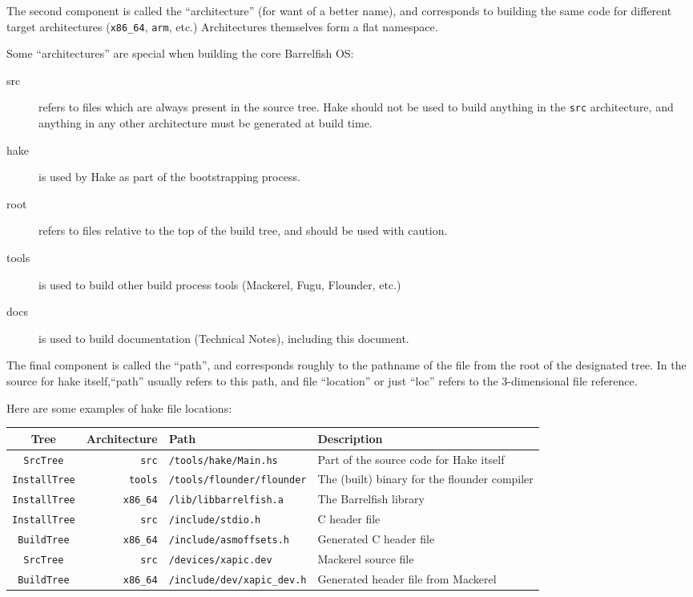 \documentclass[a4paper,twoside]{report} %
\begin{document}
The second component is called the ``architecture'' (for want
of a better name), and corresponds to building the same code for
different target architectures (\texttt{x86\_64}, \texttt{arm}, etc.)
Architectures themselves form a flat namespace. 

Some ``architectures'' are special when building the core Barrelfish OS:
\begin{description}
\item[src] refers to files which are always present in the source
tree.  Hake should not be used to build anything in the \texttt{src}
architecture, and anything in any other architecture must be generated
at build time. 
\item[hake] is used by Hake as part of the bootstrapping process.
\item[root] refers to files relative to the top of the build
tree, and should be used with caution. 
\item[tools] is used to build other build process tools (Mackerel,
  Fugu, Flounder, etc.)
\item[docs] is used to build documentation (Technical Notes),
  including this document.
\end{description}

The final component is called the ``path'', and corresponds roughly
to the pathname of the file from the root of the designated tree. 
In the source for hake itself,``path'' usually refers to this path,
and file ``location'' or just ``loc'' refers to the 3-dimensional file
reference. 

Here are some examples of hake file locations:

\begin{tabular}{crll} Tree & Architecture & Path & Description \\ \hline
\texttt{SrcTree} & \texttt{src} & \texttt{/tools/hake/Main.hs} & Part of the source code for Hake
itself \\
\texttt{InstallTree} & \texttt{tools} & \texttt{/tools/flounder/flounder} & The (built) binary for the
flounder compiler \\
\texttt{InstallTree} & \texttt{x86\_64} & \texttt{/lib/libbarrelfish.a} & The Barrelfish
library \\
\texttt{InstallTree} & \texttt{src} & \texttt{/include/stdio.h} & C header file \\
\texttt{BuildTree} & \texttt{x86\_64} & \texttt{/include/asmoffsets.h} & Generated C header
file \\
\texttt{SrcTree} & \texttt{src} & \texttt{/devices/xapic.dev} & Mackerel source file \\
\texttt{BuildTree} & \texttt{x86\_64} &
\texttt{/include/dev/xapic\_dev.h} & Generated header file from Mackerel \\
\end{tabular}
\end{document}
